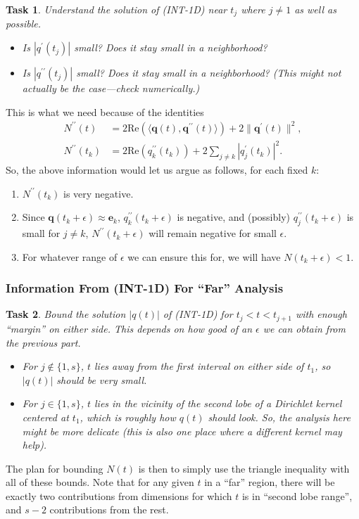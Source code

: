 \documentclass[11pt]{article}
\newcommand{\ra}{\rangle}
\newcommand{\la}{\langle}
\renewcommand{\Re}{\mathrm{Re}}
\newcommand{\be}{\bm e}
\newcommand{\bq}{\bm q}
\newtheorem{task}{Task}
\begin{document}
\begin{task}
    Understand the solution of (INT-1D) near $t_j$ where $j \neq 1$ as well as possible.
    \begin{itemize}
    \item Is $|q^\prime(t_j)|$ small? Does it stay small in a neighborhood?
    \item Is $|q^{\prime\prime}(t_j)|$ small? Does it stay small in a neighborhood? (This might not actually be the case---check numerically.)
    \end{itemize}
\end{task}
This is what we need because of the identities
\begin{align*}
  N^{\prime\prime}(t) &= 2\Re(\la \bq(t), \bq^{\prime\prime}(t) \ra) + 2\|\bq^\prime(t)\|^2, \\
  N^{\prime\prime}(t_k) &= 2\Re(q^{\prime\prime}_k(t_k)) + 2\sum_{j \neq k}|q_j^\prime(t_k)|^2.
\end{align*}
So, the above information would let us argue as follows, for each fixed $k$:
\begin{enumerate}
\item $N^{\prime\prime}(t_k)$ is very negative.
\item Since $\bq(t_k + \epsilon) \approx \be_k$, $q_k^{\prime\prime}(t_k + \epsilon)$ is negative, and (possibly) $q_j^{\prime\prime}(t_k + \epsilon)$ is small for $j \neq k$, $N^{\prime\prime}(t_k + \epsilon)$ will remain negative for small $\epsilon$.
\item For whatever range of $\epsilon$ we can ensure this for, we will have $N(t_k + \epsilon) < 1$.
\end{enumerate}

\subsubsection{Information From (INT-1D) For ``Far'' Analysis}

\begin{task}
    Bound the solution $|q(t)|$ of (INT-1D) for $t_j < t < t_{j + 1}$ with enough ``margin'' on either side.
    This depends on how good of an $\epsilon$ we can obtain from the previous part.
    \begin{itemize}
    \item For $j \notin \{1, s\}$, $t$ lies away from the first interval on either side of $t_1$, so $|q(t)|$ should be very small.
    \item For $j \in \{1, s\}$, $t$ lies in the vicinity of the second lobe of a Dirichlet kernel centered at $t_1$, which is roughly how $q(t)$ should look.
        So, the analysis here might be more delicate (this is also one place where a different kernel may help).
    \end{itemize}
\end{task}
The plan for bounding $N(t)$ is then to simply use the triangle inequality with all of these bounds.
Note that for any given $t$ in a ``far'' region, there will be exactly two contributions from dimensions for which $t$ is in ``second lobe range'', and $s - 2$ contributions from the rest.
\end{document}
